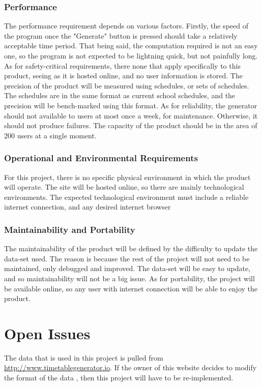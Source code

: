 \documentclass[12pt]{article}
\begin{document}
\subsubsection{Performance}
The performance requirement depends on various factors. Firstly, the speed of the program once the "Generate" button is pressed should take a relatively acceptable time period. That being said, the computation required is not an easy one, so the program is not expected to be lightning quick, but not painfully long. As for safety-critical requirements, there none that apply specifically to this product, seeing as it is hosted online, and no user information is stored. The precision of the product will be measured using schedules, or sets of schedules. The schedules are in the same format as current school schedules, and the precision will be bench-marked using this format. As for reliability, the generator should not available to users at most once a week, for maintenance. Otherwise, it should not produce failures. The capacity of the product should be in the area of 200 users at a single moment.

\subsubsection{Operational and Environmental Requirements}
For this project, there is no specific physical environment in which the product will operate. The site will be hosted online, so there are mainly technological environments. The expected technological environment must include a reliable internet connection, and any desired internet browser

\subsubsection{Maintainability and Portability}
The maintainability of the product will be defined by the difficulty to update the data-set used. The reason is because the rest of the project will not need to be maintained, only debugged and improved. The data-set will be easy to update, and so maintainability will not be a big issue. As for portability, the project will be available online, so any user with internet connection will be able to enjoy the product.
\newpage

\section{Open Issues}

\tab The data that is used in this project is pulled from \url{http://www.timetablegenerator.io}. If the owner of this website decides to modify the format of the data , then this project will have to be re-implemented. 
\end{document}

